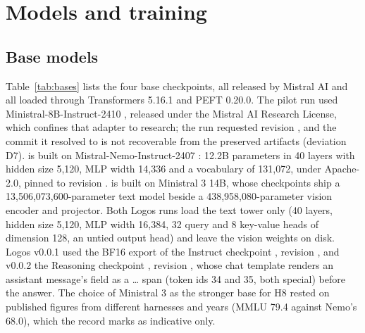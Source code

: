 \section{Models and training}\label{sec:models}

\subsection{Base models}
Table~\ref{tab:bases} lists the four base checkpoints, all released by Mistral AI \citep{mistral2024nemo,mistral2025mistral3,liu2026ministral3} and all loaded through Transformers 5.16.1 and PEFT 0.20.0. The pilot run used Ministral-8B-Instruct-2410 \citep{mistral2024ministral8b}, released under the Mistral AI Research License, which confines that adapter to research; the run requested revision , and the commit it resolved to is not recoverable from the preserved artifacts (deviation D7). \hermes{} is built on Mistral-Nemo-Instruct-2407 \citep{mistral2024nemoinstruct}: 12.2B parameters in 40 layers with hidden size 5,120, MLP width 14,336 and a vocabulary of 131,072, under Apache-2.0, pinned to revision . \logos{} is built on Ministral 3 14B, whose checkpoints ship a 13,506,073,600-parameter text model beside a 438,958,080-parameter vision encoder and projector. Both Logos runs load the text tower only (40 layers, hidden size 5,120, MLP width 16,384, 32 query and 8 key-value heads of dimension 128, an untied output head) and leave the vision weights on disk. Logos v0.0.1 used the BF16 export of the Instruct checkpoint \citep{mistral2025ministral14binstruct}, revision , and v0.0.2 the Reasoning checkpoint \citep{mistral2025ministral14breasoning}, revision , whose chat template renders an assistant message's  field as a \code{[THINK]}\ldots\code{[/THINK]} span (token ids 34 and 35, both special) before the answer. The choice of Ministral 3 as the stronger base for H8 rested on published figures from different harnesses and years (MMLU 79.4 against Nemo's 68.0), which the record marks as indicative only.

